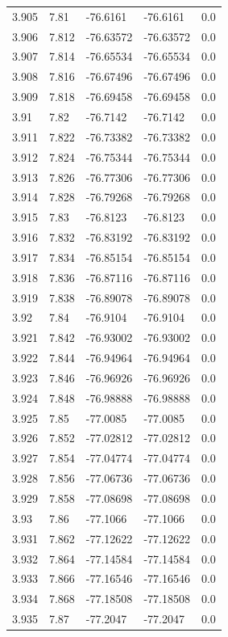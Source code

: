 \begin{tabular}{lllll}
3.905 & 7.81 & -76.6161 & -76.6161 & 0.0 \\
3.906 & 7.812 & -76.63572 & -76.63572 & 0.0 \\
3.907 & 7.814 & -76.65534 & -76.65534 & 0.0 \\
3.908 & 7.816 & -76.67496 & -76.67496 & 0.0 \\
3.909 & 7.818 & -76.69458 & -76.69458 & 0.0 \\
3.91 & 7.82 & -76.7142 & -76.7142 & 0.0 \\
3.911 & 7.822 & -76.73382 & -76.73382 & 0.0 \\
3.912 & 7.824 & -76.75344 & -76.75344 & 0.0 \\
3.913 & 7.826 & -76.77306 & -76.77306 & 0.0 \\
3.914 & 7.828 & -76.79268 & -76.79268 & 0.0 \\
3.915 & 7.83 & -76.8123 & -76.8123 & 0.0 \\
3.916 & 7.832 & -76.83192 & -76.83192 & 0.0 \\
3.917 & 7.834 & -76.85154 & -76.85154 & 0.0 \\
3.918 & 7.836 & -76.87116 & -76.87116 & 0.0 \\
3.919 & 7.838 & -76.89078 & -76.89078 & 0.0 \\
3.92 & 7.84 & -76.9104 & -76.9104 & 0.0 \\
3.921 & 7.842 & -76.93002 & -76.93002 & 0.0 \\
3.922 & 7.844 & -76.94964 & -76.94964 & 0.0 \\
3.923 & 7.846 & -76.96926 & -76.96926 & 0.0 \\
3.924 & 7.848 & -76.98888 & -76.98888 & 0.0 \\
3.925 & 7.85 & -77.0085 & -77.0085 & 0.0 \\
3.926 & 7.852 & -77.02812 & -77.02812 & 0.0 \\
3.927 & 7.854 & -77.04774 & -77.04774 & 0.0 \\
3.928 & 7.856 & -77.06736 & -77.06736 & 0.0 \\
3.929 & 7.858 & -77.08698 & -77.08698 & 0.0 \\
3.93 & 7.86 & -77.1066 & -77.1066 & 0.0 \\
3.931 & 7.862 & -77.12622 & -77.12622 & 0.0 \\
3.932 & 7.864 & -77.14584 & -77.14584 & 0.0 \\
3.933 & 7.866 & -77.16546 & -77.16546 & 0.0 \\
3.934 & 7.868 & -77.18508 & -77.18508 & 0.0 \\
3.935 & 7.87 & -77.2047 & -77.2047 & 0.0 \\

\end{tabular}
